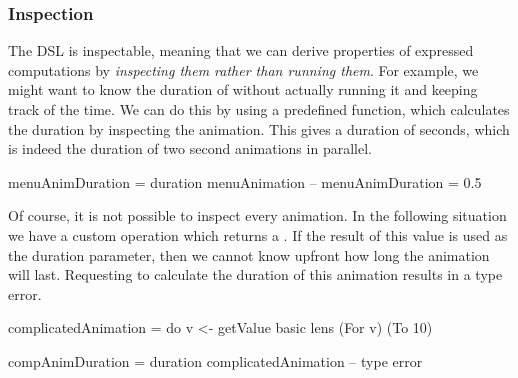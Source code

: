 



\subsubsection{Inspection}

The DSL is inspectable, meaning that we can derive properties of expressed computations by \emph{inspecting them rather than running them}. For example, we might want to know the duration of  without actually running it and keeping track of the time. We can do this by using a predefined  function, which calculates the duration by inspecting the animation. This gives a duration of  seconds, which is indeed the duration of two  second animations in parallel.

\begin{spec}
menuAnimDuration = duration menuAnimation
-- menuAnimDuration = 0.5 
\end{spec}

Of course, it is not possible to inspect every animation. In the following situation we have a custom operation  which returns a . If the result of this value is used as the duration parameter, then we cannot know upfront how long the animation will last. Requesting to calculate the duration of this animation results in a type error.

\begin{spec}
complicatedAnimation = do
  v <- getValue
  basic lens (For v) (To 10)

compAnimDuration = duration complicatedAnimation
-- type error
\end{spec}

